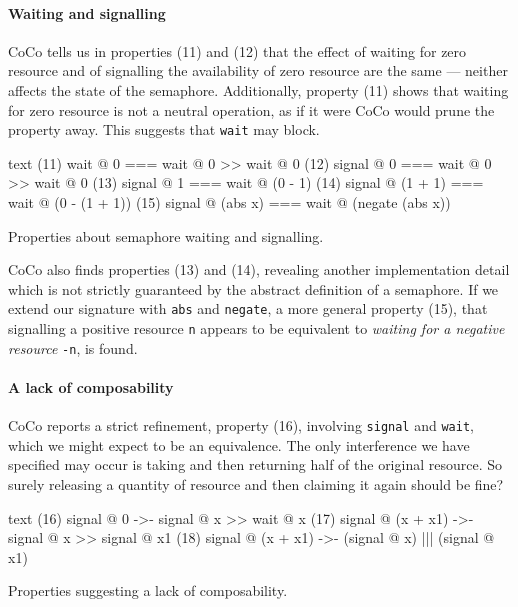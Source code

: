 \paragraph{Waiting and signalling}
CoCo tells us in properties (11) and (12) that the effect of waiting
for zero resource and of signalling the availability of zero resource
are the same --- neither affects the state of the semaphore.
Additionally, property (11) shows that waiting for zero resource is
not a neutral operation, as if it were CoCo would prune the property
away.  This suggests that \verb|wait| may block.

\begin{listing}
\centering
\begin{cminted}{text}
(11)          wait @ 0  ===  wait @ 0 >> wait @ 0
(12)        signal @ 0  ===  wait @ 0 >> wait @ 0
(13)        signal @ 1  ===  wait @ (0 - 1)
(14)  signal @ (1 + 1)  ===  wait @ (0 - (1 + 1))
(15)  signal @ (abs x)  ===  wait @ (negate (abs x))
\end{cminted}
\caption{Properties about semaphore waiting and signalling.}\label{lst:sem2}
\end{listing}

CoCo also finds properties (13) and (14), revealing another
implementation detail which is not strictly guaranteed by the abstract
definition of a semaphore.  If we extend our signature with \verb|abs|
and \verb|negate|, a more general property (15), that signalling a
positive resource \verb|n| appears to be equivalent to \emph{waiting
  for a negative resource} \verb|-n|, is found.

\paragraph{A lack of composability}
CoCo reports a strict refinement, property (16), involving
\verb|signal| and \verb|wait|, which we might expect to be an
equivalence.  The only interference we have specified may occur is
taking and then returning half of the original resource.  So surely
releasing a quantity of resource and then claiming it again should be
fine?

\begin{listing}
\centering
\begin{cminted}{text}
(16)         signal @ 0  ->-  signal @ x >> wait @ x
(17)  signal @ (x + x1)  ->-  signal @ x >> signal @ x1
(18)  signal @ (x + x1)  ->-  (signal @ x) ||| (signal @ x1)
\end{cminted}
\caption{Properties suggesting a lack of composability.}\label{lst:sem3}
\end{listing}

